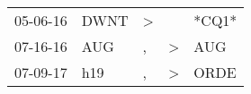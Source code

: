 \begin{supertabular}{p{0.07\textwidth}p{0.06\textwidth}p{0.02\textwidth}p{0.02\textwidth}p{0.06\textwidth}}
 05-06-16\textsuperscript{} &  DWNT\textsuperscript{} &  \textgreater &               &                   *CQ1* \\
 07-16-16\textsuperscript{} &   AUG\textsuperscript{} &             , &  \textgreater &   AUG\textsuperscript{} \\
 07-09-17\textsuperscript{} &   h19\textsuperscript{} &             , &  \textgreater &  ORDE\textsuperscript{} \\
\end{supertabular}
